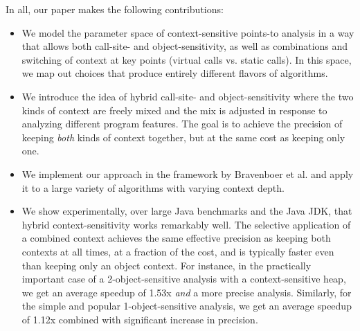 


In all, our paper makes the following contributions:

\begin{itemize}
\item We model the parameter space of context-sensitive points-to
  analysis in a way that allows both call-site- and
  object-sensitivity, as well as combinations and switching of context
  at key points (virtual calls vs. static calls). In this space, we
  map out choices that produce entirely different flavors of
  algorithms.

\item We introduce the idea of hybrid call-site- and
  object-sensitivity where the two kinds of context are freely mixed
  and the mix is adjusted in response to analyzing different program
  features. The goal is to achieve the precision of keeping
  \emph{both} kinds of context together, but at the same cost as
  keeping only one.

\item We implement our approach in the \doop{} framework
  by Bravenboer et al. \cite{oopsla:2009:Bravenboer} and apply it to a large
  variety of algorithms with varying context depth.

\item We show experimentally, over large Java benchmarks and the Java
  JDK, that hybrid context-sensitivity works remarkably well. 
  The selective application of a combined context achieves the same
  effective precision as keeping both contexts at all times, at a
  fraction of the cost, and is typically faster even than keeping only
  an object context. For instance, in the practically important case
  of a 2-object-sensitive analysis with a context-sensitive heap, we
  get an average speedup of 1.53x \emph{and} a more precise
  analysis. Similarly, for the simple and popular 1-object-sensitive
  analysis, we get an average speedup of 1.12x combined with significant
  increase in precision.

\end{itemize}

